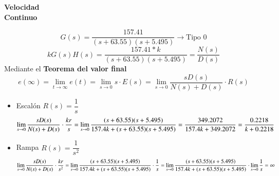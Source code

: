 \begin{center}
  {\Large\textbf{Velocidad}}\\
   \textbf{Continuo}
  \end{center}
\begin{equation}
  G(s) = \dfrac{157.41}{(s+63.55)(s+5.495)} \rightarrow \text{Tipo 0}
\end{equation}
\begin{equation}
    kG(s)H(s) = \dfrac{157.41*k}{(s+63.55)(s+5.495)} =
  \dfrac{N(s)}{D(s)} 
\end{equation}
Mediante el \textbf{Teorema del valor final} 
\begin{equation}
  e(\infty) = \lim_{t\to\infty}e(t)=\lim_{s\to 0}s\cdot E(s)=
  \lim_{s\to 0}\dfrac{s D(s)}{N(s)+D(s)} \cdot R(s) 
\end{equation}
\begin{itemize}
\item Escalón $R(s) =\dfrac{1}{s}$
  \begin{equation}
    \small
    \lim_{s\to 0}\dfrac{s D(s)}{N(s)+D(s)} \cdot \dfrac{kr}{s} =
    \lim_{s\to 0}\dfrac{(s+63.55)(s+5.495)}{157.4 k+(s+63.55)(s+5.495)} =
    \dfrac{349.2072}{157.4k+349.2072} = \dfrac{0.2218}{k+0.2218}
    \end{equation}
  \item Rampa $R(s) = \dfrac{1}{s^2}$
    \begin{equation}
      \small
    \lim_{s\to 0}\dfrac{s D(s)}{N(s)+D(s)} \cdot \dfrac{kr}{s^2} =
    \lim_{s\to 0}\dfrac{(s+63.55)(s+5.495)}{157.4 k+(s+63.55)(s+5.495)}\cdot\dfrac{1}{s} =
 \lim_{s\to 0}\dfrac{(s+63.55)(s+5.495)}{157.4 k+(s+63.55)(s+5.495)}\cdot \lim_{s\to 0}\dfrac{1}{s} = \infty
    \end{equation}
  \end{itemize}

